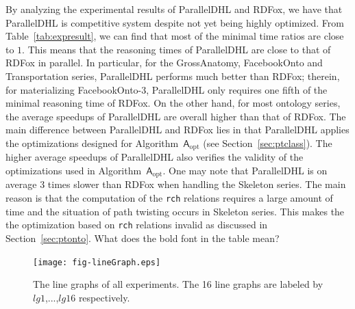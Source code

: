 By analyzing the experimental results of ParallelDHL and RDFox, we have that
ParallelDHL is competitive system despite not yet being highly optimized.
From Table~\ref{tab:expresult}, we can find that most of the minimal time ratios are close to $1$.
This means that the reasoning times of ParallelDHL are close to that of RDFox in parallel.
In particular, for the GrossAnatomy, FacebookOnto and Transportation series, ParallelDHL performs
much better than RDFox; therein, for materializing FacebookOnto-3, ParallelDHL
only requires one fifth of the minimal reasoning time of RDFox.
On the other hand, for most ontology series,
the average speedups of ParallelDHL are overall higher than that of RDFox.
The main difference between ParallelDHL and RDFox lies in that ParallelDHL applies
the optimizations designed for Algorithm~$\mathsf{A}_{\text{opt}}$ (see Section~\ref{sec:ptclass}).
The higher average speedups of ParallelDHL also verifies the validity of the optimizations
used in Algorithm~$\mathsf{A}_{\text{opt}}$.
One may note that ParallelDHL is on average 3 times slower than RDFox
when handling the Skeleton series.
The main reason is that the computation of the \texttt{rch} relations
requires a large amount of time and the situation of path twisting occurs in Skeleton series.
This makes the the optimization based on \texttt{rch} relations invalid as discussed
in Section~\ref{sec:ptonto}. {\color{red}What does the bold font in
  the table mean?}


\begin{figure}[htbp]
\begin{center}
\texttt{[image: fig-lineGraph.eps]}
\caption{The line graphs of all experiments. The 16 line graphs are labeled by $lg1$,...,$lg16$ respectively.}
\label{fig:linegraph}
\end{center}
\end{figure}

